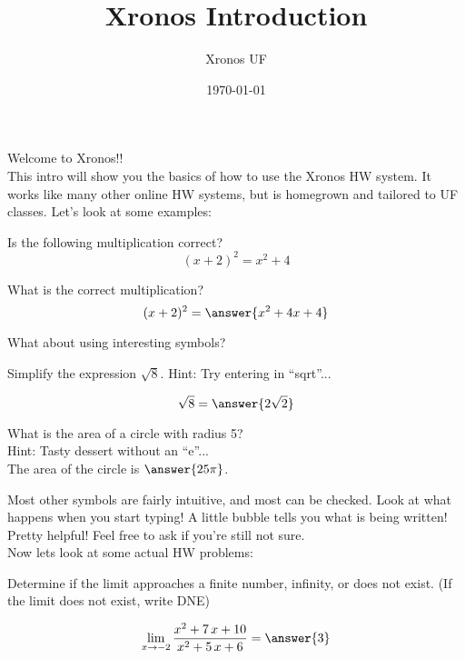 \documentclass[]{ximera}
\title{Xronos Introduction}
\author{Xronos UF}
\date{\today}
\begin{document}
\maketitle


{\huge Welcome to Xronos!!}\\
\large
This intro will show you the basics of how to use the Xronos HW system.  It works like many other online HW systems, but is homegrown and tailored to UF classes.  Let's look at some examples:


\begin{problem}
Is the following multiplication correct?
\[(x+2)^2 = x^2+4\]
\begin{multipleChoice}
\end{multipleChoice}

\begin{problem}
What is the correct multiplication?
\[(x+2)^2=\answer{x^2+4x+4}\]
\end{problem}

\end{problem}


What about using interesting symbols?

\begin{problem}
Simplify the expression $\sqrt{8}$.  Hint:  Try entering in ``sqrt''... 

\[\sqrt{8}=\answer{2\sqrt{2}}\]

\end{problem}

\begin{problem}
What is the area of a circle with radius 5? \\ Hint: Tasty dessert without an ``e''... \\

The area of the circle is $\answer{25\pi}$.

\end{problem}


Most other symbols are fairly intuitive, and most can be checked.  Look at what happens when you start typing!  A little bubble tells you what is being written!  Pretty helpful!  Feel free to ask if you're still not sure.\\

Now lets look at some actual HW problems:

\begin{problem}
Determine if the limit approaches a finite number, infinity, or does not exist. (If the limit does not exist, write DNE)

\[\lim_{x\to{-2}}\dfrac{x^{2} + 7 \, x + 10}{x^{2} + 5 \, x + 6}=\answer{3}\]
\end{problem}
\end{document}
